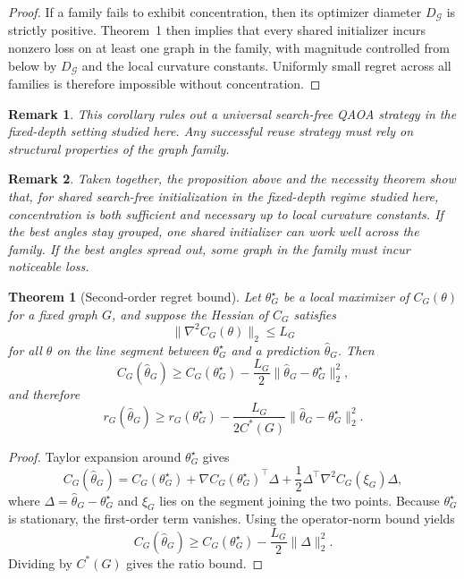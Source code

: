 \documentclass[
  reprint,
  twocolumn,
  aps,
  superscriptaddress,
  longbibliography,
  floatfix
]{revtex4-2}
\newtheorem{theorem}{Theorem}
\newtheorem{remark}{Remark}
\begin{document}
\begin{proof}
If a family fails to exhibit concentration, then its optimizer diameter $D_{\mathcal{G}}$ is strictly positive. Theorem~1 then implies that every shared initializer incurs nonzero loss on at least one graph in the family, with magnitude controlled from below by $D_{\mathcal{G}}$ and the local curvature constants. Uniformly small regret across all families is therefore impossible without concentration.
\end{proof}

\begin{remark}
This corollary rules out a universal search-free QAOA strategy in the fixed-depth setting studied here. Any successful reuse strategy must rely on structural properties of the graph family.
\end{remark}

\begin{remark}
Taken together, the proposition above and the necessity theorem show that, for shared search-free initialization in the fixed-depth regime studied here, concentration is both sufficient and necessary up to local curvature constants. If the best angles stay grouped, one shared initializer can work well across the family. If the best angles spread out, some graph in the family must incur noticeable loss.
\end{remark}

\begin{theorem}[Second-order regret bound]
Let $\theta_G^\star$ be a local maximizer of $C_G(\theta)$ for a fixed graph $G$, and suppose the Hessian of $C_G$ satisfies
\begin{equation}
\|\nabla^2 C_G(\theta)\|_2 \leq L_G
\end{equation}
for all $\theta$ on the line segment between $\theta_G^\star$ and a prediction $\hat\theta_G$. Then
\begin{equation}
C_G(\hat\theta_G) \geq C_G(\theta_G^\star) - \frac{L_G}{2}\|\hat\theta_G - \theta_G^\star\|_2^2,
\end{equation}
and therefore
\begin{equation}
r_G(\hat\theta_G) \geq r_G(\theta_G^\star) - \frac{L_G}{2C^*(G)}\|\hat\theta_G - \theta_G^\star\|_2^2.
\end{equation}
\end{theorem}

\begin{proof}
Taylor expansion around $\theta_G^\star$ gives
\begin{equation}
C_G(\hat\theta_G) = C_G(\theta_G^\star) + \nabla C_G(\theta_G^\star)^\top \Delta + \frac{1}{2}\Delta^\top \nabla^2 C_G(\xi_G) \Delta,
\end{equation}
where $\Delta = \hat\theta_G-\theta_G^\star$ and $\xi_G$ lies on the segment joining the two points. Because $\theta_G^\star$ is stationary, the first-order term vanishes. Using the operator-norm bound yields
\begin{equation}
C_G(\hat\theta_G) \geq C_G(\theta_G^\star) - \frac{L_G}{2}\|\Delta\|_2^2.
\end{equation}
Dividing by $C^*(G)$ gives the ratio bound.
\end{proof}
\end{document}
